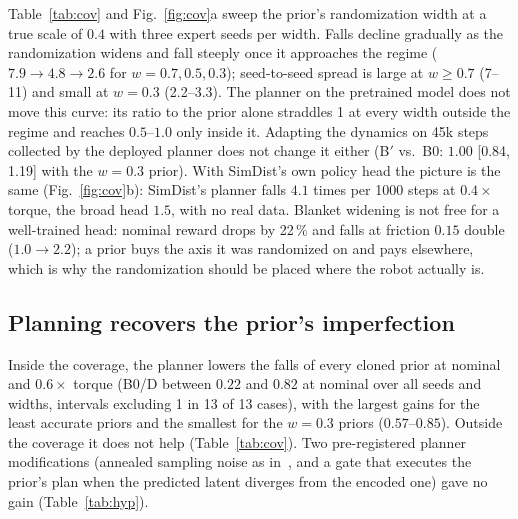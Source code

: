 \documentclass[conference]{IEEEtran}
\begin{document}
Table~\ref{tab:cov} and Fig.~\ref{fig:cov}a sweep the prior's randomization width at a true scale of $0.4$ with three expert seeds per width. Falls decline gradually as the randomization widens and fall steeply once it approaches the regime ($7.9\to4.8\to2.6$ for $w=0.7,0.5,0.3$); seed-to-seed spread is large at $w\ge0.7$ (7--11) and small at $w=0.3$ (2.2--3.3). The planner on the pretrained model does not move this curve: its ratio to the prior alone straddles 1 at every width outside the regime and reaches $0.5$--$1.0$ only inside it. Adapting the dynamics on 45k steps collected by the deployed planner does not change it either (B$'$ vs.\ B0: $1.00$ [0.84, 1.19] with the $w=0.3$ prior). With SimDist's own policy head the picture is the same (Fig.~\ref{fig:cov}b): SimDist's planner falls $4.1$ times per 1000 steps at $0.4\times$ torque, the broad head $1.5$, with no real data. Blanket widening is not free for a well-trained head: nominal reward drops by 22\,\% and falls at friction $0.15$ double ($1.0\to2.2$); a prior buys the axis it was randomized on and pays elsewhere, which is why the randomization should be placed where the robot actually is.

\subsection{Planning recovers the prior's imperfection}
Inside the coverage, the planner lowers the falls of every cloned prior at nominal and $0.6\times$ torque (B0/D between $0.22$ and $0.82$ at nominal over all seeds and widths, intervals excluding 1 in 13 of 13 cases), with the largest gains for the least accurate priors and the smallest for the $w=0.3$ priors ($0.57$--$0.85$). Outside the coverage it does not help (Table~\ref{tab:cov}). Two pre-registered planner modifications (annealed sampling noise as in~\cite{xue2025dialmpc}, and a gate that executes the prior's plan when the predicted latent diverges from the encoded one) gave no gain (Table~\ref{tab:hyp}).
\end{document}
